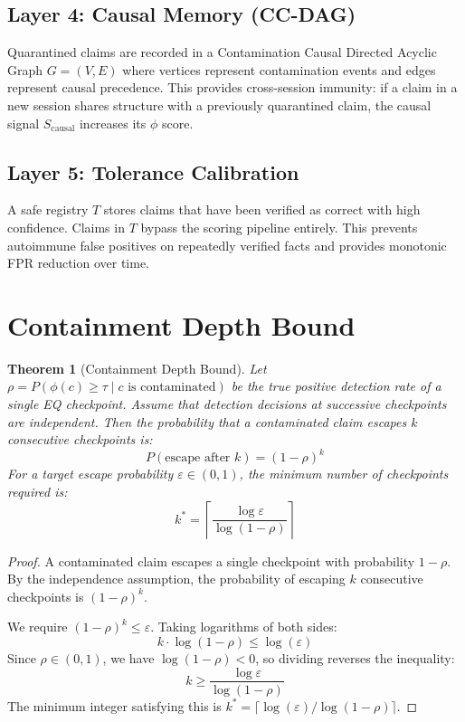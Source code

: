 \documentclass[11pt,a4paper]{article}
\newtheorem{theorem}{Theorem}
\begin{document}
\subsection{Layer 4: Causal Memory (CC-DAG)}

Quarantined claims are recorded in a Contamination Causal Directed Acyclic Graph $G = (V, E)$ where vertices represent contamination events and edges represent causal precedence. This provides cross-session immunity: if a claim in a new session shares structure with a previously quarantined claim, the causal signal $S_{\text{causal}}$ increases its $\phi$ score.

\subsection{Layer 5: Tolerance Calibration}

A safe registry $T$ stores claims that have been verified as correct with high confidence. Claims in $T$ bypass the scoring pipeline entirely. This prevents autoimmune false positives on repeatedly verified facts and provides monotonic FPR reduction over time.

\section{Containment Depth Bound}

\begin{theorem}[Containment Depth Bound]
Let $\rho = P(\phi(c) \geq \tau \mid c \text{ is contaminated})$ be the true positive detection rate of a single EQ checkpoint. Assume that detection decisions at successive checkpoints are independent. Then the probability that a contaminated claim escapes $k$ consecutive checkpoints is:
\[
P(\text{escape after } k) = (1-\rho)^k
\]
For a target escape probability $\varepsilon \in (0,1)$, the minimum number of checkpoints required is:
\[
k^* = \left\lceil \frac{\log \varepsilon}{\log(1-\rho)} \right\rceil
\]
\end{theorem}

\begin{proof}
A contaminated claim escapes a single checkpoint with probability $1-\rho$. By the independence assumption, the probability of escaping $k$ consecutive checkpoints is $(1-\rho)^k$.

We require $(1-\rho)^k \leq \varepsilon$. Taking logarithms of both sides:
\[
k \cdot \log(1-\rho) \leq \log(\varepsilon)
\]
Since $\rho \in (0,1)$, we have $\log(1-\rho) < 0$, so dividing reverses the inequality:
\[
k \geq \frac{\log \varepsilon}{\log(1-\rho)}
\]
The minimum integer satisfying this is $k^* = \lceil \log(\varepsilon) / \log(1-\rho) \rceil$.
\end{proof}
\end{document}
